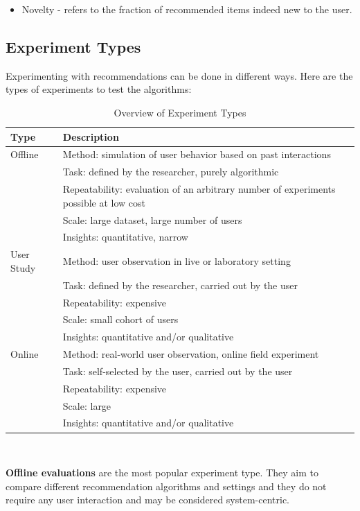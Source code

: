 \documentclass[\myFontSize,oneside,english,hidelinks,a4paper]{article}
\begin{document}
\begin{itemize}
\item Novelty - refers to the fraction of recommended items indeed new to the user.\\

\end{itemize}
%
%
\subsection{Experiment Types}
Experimenting with recommendations can be done in different ways. Here are the types of experiments to test the algorithms:
{
\renewcommand{\arraystretch}{1.5}
\begin{table}[h!]
\centering
\begin{tabular}{p{3cm}|p{10cm}}
\hline
\textbf{Type} & \textbf{Description} \\
\hline
Offline & Method: simulation of user behavior based on past interactions \\
        & Task: defined by the researcher, purely algorithmic \\
        & Repeatability: evaluation of an arbitrary number of experiments possible at low cost \\
        & Scale: large dataset, large number of users \\
        & Insights: quantitative, narrow \\
\hline
User Study & Method: user observation in live or laboratory setting \\
           & Task: defined by the researcher, carried out by the user \\
           & Repeatability: expensive \\
           & Scale: small cohort of users \\
           & Insights: quantitative and/or qualitative \\
\hline
Online & Method: real-world user observation, online field experiment \\
       & Task: self-selected by the user, carried out by the user \\
       & Repeatability: expensive \\
       & Scale: large \\
       & Insights: quantitative and/or qualitative \\
\hline
\end{tabular}

\caption{Overview of Experiment Types \cite{Zangerle2023}}
\end{table}\\
}
%
%
\textbf{Offline evaluations} are the most popular experiment type. They aim to compare different recommendation algorithms and settings and they do not require any user interaction and may be considered system-centric.  \cite{Zangerle2023}\\\\
%
%
\end{document}
